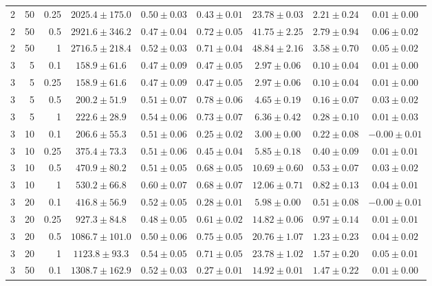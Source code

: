 \begin{table}[htbp]
\begin{tabular}{@{}rrrcccccc@{}}
2 & 50 & 0.25 & $2025.4 \pm 175.0$ & $0.50 \pm 0.03$ & $0.43 \pm 0.01$ & $23.78 \pm 0.03$ & $2.21 \pm 0.24$ & $0.01 \pm 0.00$ \\
2 & 50 & 0.5 & $2921.6 \pm 346.2$ & $0.47 \pm 0.04$ & $0.72 \pm 0.05$ & $41.75 \pm 2.25$ & $2.79 \pm 0.94$ & $0.06 \pm 0.02$ \\
2 & 50 & 1 & $2716.5 \pm 218.4$ & $0.52 \pm 0.03$ & $0.71 \pm 0.04$ & $48.84 \pm 2.16$ & $3.58 \pm 0.70$ & $0.05 \pm 0.02$ \\
\midrule
3 & 5 & 0.1 & $158.9 \pm 61.6$ & $0.47 \pm 0.09$ & $0.47 \pm 0.05$ & $2.97 \pm 0.06$ & $0.10 \pm 0.04$ & $0.01 \pm 0.00$ \\
3 & 5 & 0.25 & $158.9 \pm 61.6$ & $0.47 \pm 0.09$ & $0.47 \pm 0.05$ & $2.97 \pm 0.06$ & $0.10 \pm 0.04$ & $0.01 \pm 0.00$ \\
3 & 5 & 0.5 & $200.2 \pm 51.9$ & $0.51 \pm 0.07$ & $0.78 \pm 0.06$ & $4.65 \pm 0.19$ & $0.16 \pm 0.07$ & $0.03 \pm 0.02$ \\
3 & 5 & 1 & $222.6 \pm 28.9$ & $0.54 \pm 0.06$ & $0.73 \pm 0.07$ & $6.36 \pm 0.42$ & $0.28 \pm 0.10$ & $0.01 \pm 0.03$ \\
3 & 10 & 0.1 & $206.6 \pm 55.3$ & $0.51 \pm 0.06$ & $0.25 \pm 0.02$ & $3.00 \pm 0.00$ & $0.22 \pm 0.08$ & $-0.00 \pm 0.01$ \\
3 & 10 & 0.25 & $375.4 \pm 73.3$ & $0.51 \pm 0.06$ & $0.45 \pm 0.04$ & $5.85 \pm 0.18$ & $0.40 \pm 0.09$ & $0.01 \pm 0.01$ \\
3 & 10 & 0.5 & $470.9 \pm 80.2$ & $0.51 \pm 0.05$ & $0.68 \pm 0.05$ & $10.69 \pm 0.60$ & $0.53 \pm 0.07$ & $0.03 \pm 0.02$ \\
3 & 10 & 1 & $530.2 \pm 66.8$ & $0.60 \pm 0.07$ & $0.68 \pm 0.07$ & $12.06 \pm 0.71$ & $0.82 \pm 0.13$ & $0.04 \pm 0.01$ \\
3 & 20 & 0.1 & $416.8 \pm 56.9$ & $0.52 \pm 0.05$ & $0.28 \pm 0.01$ & $5.98 \pm 0.00$ & $0.51 \pm 0.08$ & $-0.00 \pm 0.01$ \\
3 & 20 & 0.25 & $927.3 \pm 84.8$ & $0.48 \pm 0.05$ & $0.61 \pm 0.02$ & $14.82 \pm 0.06$ & $0.97 \pm 0.14$ & $0.01 \pm 0.01$ \\
3 & 20 & 0.5 & $1086.7 \pm 101.0$ & $0.50 \pm 0.06$ & $0.75 \pm 0.05$ & $20.76 \pm 1.07$ & $1.23 \pm 0.23$ & $0.04 \pm 0.02$ \\
3 & 20 & 1 & $1123.8 \pm 93.3$ & $0.54 \pm 0.05$ & $0.71 \pm 0.05$ & $23.78 \pm 1.02$ & $1.57 \pm 0.20$ & $0.05 \pm 0.01$ \\
3 & 50 & 0.1 & $1308.7 \pm 162.9$ & $0.52 \pm 0.03$ & $0.27 \pm 0.01$ & $14.92 \pm 0.01$ & $1.47 \pm 0.22$ & $0.01 \pm 0.00$ \\

\end{tabular}
\end{table}
